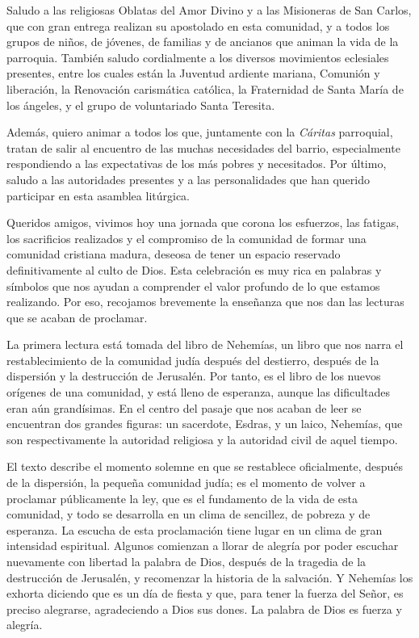\begin{body}
					Saludo a las religiosas Oblatas del Amor Divino y a las Misioneras de San Carlos, que con gran entrega realizan su apostolado en esta comunidad, y a todos los grupos de niños, de jóvenes, de familias y de ancianos que animan la vida de la parroquia. También saludo cordialmente a los diversos movimientos eclesiales presentes, entre los cuales están la Juventud ardiente mariana, Comunión y liberación, la Renovación carismática católica, la Fraternidad de Santa María de los ángeles, y el grupo de voluntariado Santa Teresita.
					
					Además, quiero animar a todos los que, juntamente con la \emph{Cáritas} parroquial, tratan de salir al encuentro de las muchas necesidades del barrio, especialmente respondiendo a las expectativas de los más pobres y necesitados. Por último, saludo a las autoridades presentes y a las personalidades que han querido participar en esta asamblea litúrgica.
					
					Queridos amigos, vivimos hoy una jornada que corona los esfuerzos, las fatigas, los sacrificios realizados y el compromiso de la comunidad de formar una comunidad cristiana madura, deseosa de tener un espacio reservado definitivamente al culto de Dios. Esta celebración es muy rica en palabras y símbolos que nos ayudan a comprender el valor profundo de lo que estamos realizando. Por eso, recojamos brevemente la enseñanza que nos dan las lecturas que se acaban de proclamar.
					
					La primera lectura está tomada del libro de Nehemías, un libro que nos narra el restablecimiento de la comunidad judía después del destierro, después de la dispersión y la destrucción de Jerusalén. Por tanto, es el libro de los nuevos orígenes de una comunidad, y está lleno de esperanza, aunque las dificultades eran aún grandísimas. En el centro del pasaje que nos acaban de leer se encuentran dos grandes figuras: un sacerdote, Esdras, y un laico, Nehemías, que son respectivamente la autoridad religiosa y la autoridad civil de aquel tiempo.
					
					El texto describe el momento solemne en que se restablece oficialmente, después de la dispersión, la pequeña comunidad judía; es el momento de volver a proclamar públicamente la ley, que es el fundamento de la vida de esta comunidad, y todo se desarrolla en un clima de sencillez, de pobreza y de esperanza. La escucha de esta proclamación tiene lugar en un clima de gran intensidad espiritual. Algunos comienzan a llorar de alegría por poder escuchar nuevamente con libertad la palabra de Dios, después de la tragedia de la destrucción de Jerusalén, y recomenzar la historia de la salvación. Y Nehemías los exhorta diciendo que es un día de fiesta y que, para tener la fuerza del Señor, es preciso alegrarse, agradeciendo a Dios sus dones. La palabra de Dios es fuerza y alegría.
					

\end{body}

